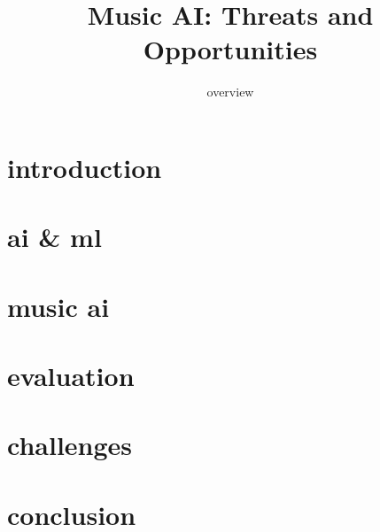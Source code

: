 
\usepackage{multirow}
\AtBeginBibliography{\tiny}

\title{Music AI: Threats and Opportunities}
\subtitle{overview} 


	

    \section[intro]{introduction}
        

    \section{ai \& ml}
        
        
    \section{music ai}
        
        
    \section{evaluation}
        
    
    \section[challenges]{challenges}
        
        
    \section{conclusion}
        
    


